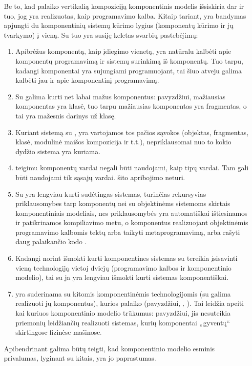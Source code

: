 Be to, kad palaiko vertikalią kompoziciją 
komponentinis modelis išsiskiria dar ir tuo, jog yra realizuotas, kaip
programavimo kalba. Kitaip tariant,  yra bandymas
apjungti du komponentinių sistemų kūrimo lygius (komponentų kūrimo
ir jų tvarkymo) į vieną. Su tuo yra susiję keletas svarbių pastebėjimų:
\begin{enumerate}
  \item Apibrėžus komponentą, kaip įdiegimo vienetą, yra natūralu
    kalbėti apie komponentų programavimą ir sistemų surinkimą iš
    komponentų. Tuo tarpu, kadangi  komponentai yra
    sujungiami programuojant, tai šiuo atveju galima kalbėti jau ir
    apie komponentinį programavimą.
  \item Su  galima kurti net labai mažus komponentus:
    pavyzdžiui,  mažiausias komponentas yra
     klasė, tuo tarpu  mažiausias
    komponentas yra fragmentas, o tai yra mažesnis darinys už klasę.
  \item Kuriant sistemą su , yra vartojamos tos
    pačios sąvokos (objektas, fragmentas, klasė, modulinė maišos
    kompozicija ir t.t.), nepriklausomai nuo to kokio dydžio
    sistema yra kuriama.
  \item \cite[36]{heineman2001component} teigimu komponentų vardai
    negali būti naudojami, kaip tipų vardai. Tam gali būti naudojami
    tik sąsajų vardai.  šito apribojimo neturi.
  \item Su  yra lengviau kurti sudėtingas sistemas,
    turinčias rekursyvias priklausomybes tarp komponentų nei su
    objektinėms sistemoms skirtais komponentiniais modeliais, nes
    priklausomybės yra automatiškai ištiesinamos ir patikrinamos
    kompiliavimo metu, o komponentus realizuojant objektinėmis
    programavimo kalbomis tektų arba taikyti metaprogramavimą,
    arba rašyti daug palaikančio kodo
    \cite[9]{scalable-component-abstractions}.
  \item Kadangi norint išmokti kurti komponentines sistemas su
     tereikia įsisavinti vieną technologiją
    vietoj dviejų (programavimo kalbos ir komponentinio modelio),
    tai su ja yra lengviau išmokti kurti sistemas komponentiškai.
  \item {} yra suderinama su kitomis komponentinėmis
    technologijomis (su  galima realizuoti jų
    komponentus), kurios palaiko  (pavyzdžiui,
    , ). Tai leidžia apeiti kai kuriuos
     komponentinio modelio trūkumus: pavyzdžiui,
    jis nesuteikia priemonių leidžiančių realizuoti sistemas, kurių
    komponentai „gyventų“ skirtingose fizinėse mašinose.
\end{enumerate}

Apibendrinant galima būtų teigti, kad  komponentinio
modelio esminis privalumas, lyginant su kitais, yra jo paprastumas.
